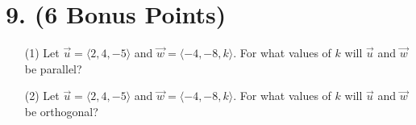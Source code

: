 \documentclass[12pt]{article}
\begin{document}
\newpage

\section*{9. (6 Bonus Points)}

\begin{itemize}
    \item[(1)] Let $\vec{u} = \langle 2, 4, -5 \rangle$ and $\vec{w} = \langle -4, -8, k \rangle$. For what values of $k$ will $\vec{u}$ and $\vec{w}$ be parallel?
    \item[(2)] Let $\vec{u} = \langle 2, 4, -5 \rangle$ and $\vec{w} = \langle -4, -8, k \rangle$. For what values of $k$ will $\vec{u}$ and $\vec{w}$ be orthogonal?
\end{itemize}
\end{document}
